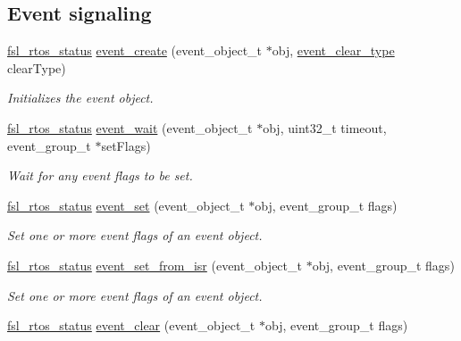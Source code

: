 \subsection*{Event signaling}
\begin{DoxyCompactItemize}
\item 
\hyperlink{group__os__abstraction_gaea1a100f413fd124de281c4b493e99d5}{fsl\+\_\+rtos\+\_\+status} \hyperlink{group__os__abstraction_ga5c1e4f564566e8367775e6aa75710091}{event\+\_\+create} (event\+\_\+object\+\_\+t $\ast$obj, \hyperlink{group__os__abstraction_ga083d5ac6d512ad2b2bd45651974118c3}{event\+\_\+clear\+\_\+type} clear\+Type)
\begin{DoxyCompactList}\small\item\em Initializes the event object. \end{DoxyCompactList}\item 
\hyperlink{group__os__abstraction_gaea1a100f413fd124de281c4b493e99d5}{fsl\+\_\+rtos\+\_\+status} \hyperlink{group__os__abstraction_ga530a290db841839efc48b810c342d5d6}{event\+\_\+wait} (event\+\_\+object\+\_\+t $\ast$obj, uint32\+\_\+t timeout, event\+\_\+group\+\_\+t $\ast$set\+Flags)
\begin{DoxyCompactList}\small\item\em Wait for any event flags to be set. \end{DoxyCompactList}\item 
\hyperlink{group__os__abstraction_gaea1a100f413fd124de281c4b493e99d5}{fsl\+\_\+rtos\+\_\+status} \hyperlink{group__os__abstraction_ga44d2ac34d27d53e9f830dee654b4fb13}{event\+\_\+set} (event\+\_\+object\+\_\+t $\ast$obj, event\+\_\+group\+\_\+t flags)
\begin{DoxyCompactList}\small\item\em Set one or more event flags of an event object. \end{DoxyCompactList}\item 
\hyperlink{group__os__abstraction_gaea1a100f413fd124de281c4b493e99d5}{fsl\+\_\+rtos\+\_\+status} \hyperlink{group__os__abstraction_gac3a4a244ad0bfcc3533bd72dbf76e363}{event\+\_\+set\+\_\+from\+\_\+isr} (event\+\_\+object\+\_\+t $\ast$obj, event\+\_\+group\+\_\+t flags)
\begin{DoxyCompactList}\small\item\em Set one or more event flags of an event object. \end{DoxyCompactList}\item 
\hyperlink{group__os__abstraction_gaea1a100f413fd124de281c4b493e99d5}{fsl\+\_\+rtos\+\_\+status} \hyperlink{group__os__abstraction_ga6aad0ccace98429036547efc6d0f20d9}{event\+\_\+clear} (event\+\_\+object\+\_\+t $\ast$obj, event\+\_\+group\+\_\+t flags)

\end{DoxyCompactItemize}
